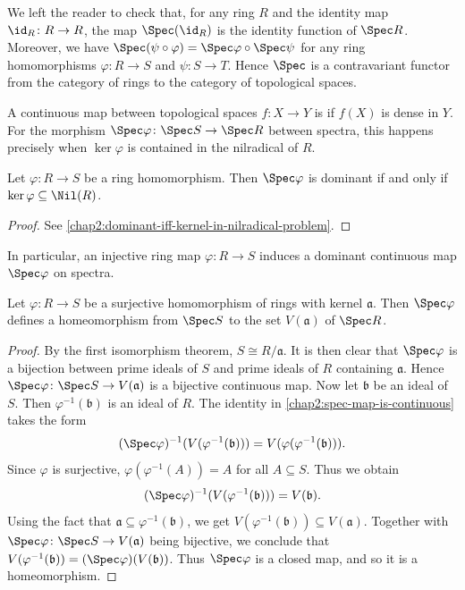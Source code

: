 We left the reader to check that, for any ring $R$ and the identity map $\id_R \colon R \to R$, the map $\Spec(\id_R)$ is the identity function of $\Spec R$. Moreover, we have $\Spec(\psi \circ \varphi) = \Spec\varphi \circ \Spec \psi$ for any ring homomorphisms $\varphi\colon R \to S$ and $\psi \colon S \to T$. Hence $\Spec$ is a contravariant functor from the category of rings to the category of topological spaces.

A continuous map between topological spaces $f \colon X \to Y$ is  if $f(X)$ is dense in $Y$. For the morphism $\Spec \varphi \colon \Spec S \to \Spec R$ between spectra, this happens precisely when $\ker \varphi$ is contained in the nilradical of $R$.

\begin{corollary}\label{chap2:dominant-iff-kernel-in-nilradical}
	Let $\varphi \colon R \to S$ be a ring homomorphism. Then $\Spec \varphi$ is dominant if and only if $\ker \varphi \subseteq \Nil(R)$.
\end{corollary}
\begin{proof}
	See \cref{chap2:dominant-iff-kernel-in-nilradical-problem}.
\end{proof}

In particular, an injective ring map $\varphi \colon R \to S$ induces a dominant continuous map $\Spec \varphi$ on spectra.

\begin{proposition}
	Let $\varphi \colon R \to S$ be a surjective homomorphism of rings with kernel $\mathfrak{a}$. Then $\Spec \varphi$ defines a homeomorphism from $\Spec S$ to the set $V(\mathfrak{a})$ of $\Spec R$.
\end{proposition}

\begin{proof}
	By the first isomorphism theorem, $S \cong R/\mathfrak{a}$. It is then clear that $\Spec \varphi$ is a bijection between prime ideals of $S$ and prime ideals of $R$ containing $\mathfrak{a}$. Hence $\Spec \varphi \colon \Spec S \to V(\mathfrak{a})$ is a bijective continuous map. Now let $\mathfrak{b}$ be an ideal of $S$. Then $\varphi^{-1}(\mathfrak{b})$ is an ideal of $R$. The identity in \cref{chap2:spec-map-is-continuous} takes the form 
	\begin{equation*}
		(\Spec \varphi)^{-1}(V(\varphi^{-1}(\mathfrak{b}))) = V(\varphi(\varphi^{-1}(\mathfrak{b}))).
	\end{equation*}
	Since $\varphi$ is surjective, $\varphi(\varphi^{-1}(A)) = A$ for all $A \subseteq S$. Thus we obtain
	\begin{equation*}
		(\Spec \varphi)^{-1}(V(\varphi^{-1}(\mathfrak{b}))) = V(\mathfrak{b}).
	\end{equation*}
	Using the fact that $\mathfrak{a} \subseteq \varphi^{-1}(\mathfrak{b})$, we get $V(\varphi^{-1}(\mathfrak{b})) \subseteq V(\mathfrak{a})$. Together with $\Spec \varphi \colon \Spec S \to V(\mathfrak{a})$ being bijective, we conclude that $V(\varphi^{-1}(\mathfrak{b})) = (\Spec \varphi) (V(\mathfrak{b}))$. Thus $\Spec \varphi$ is a closed map, and so it is a homeomorphism.
\end{proof}

